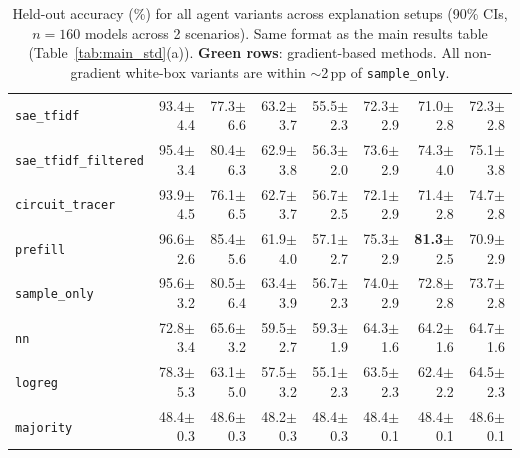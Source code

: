 \documentclass{article} %
\begin{document}
\begin{table}[t]
\begin{center}
\begin{tabular}{@{}l rrrr r | r | r@{}}
\texttt{sae\_tfidf} & 93.4{\scriptsize$\pm$4.4} & 77.3{\scriptsize$\pm$6.6} & 63.2{\scriptsize$\pm$3.7} & 55.5{\scriptsize$\pm$2.3} & 72.3{\scriptsize$\pm$2.9} & 71.0{\scriptsize$\pm$2.8} & 72.3{\scriptsize$\pm$2.8} \\
\texttt{sae\_tfidf\_filtered} & 95.4{\scriptsize$\pm$3.4} & 80.4{\scriptsize$\pm$6.3} & 62.9{\scriptsize$\pm$3.8} & 56.3{\scriptsize$\pm$2.0} & 73.6{\scriptsize$\pm$2.9} & 74.3{\scriptsize$\pm$4.0} & 75.1{\scriptsize$\pm$3.8} \\[3pt]
\texttt{circuit\_tracer} & 93.9{\scriptsize$\pm$4.5} & 76.1{\scriptsize$\pm$6.5} & 62.7{\scriptsize$\pm$3.7} & 56.7{\scriptsize$\pm$2.5} & 72.1{\scriptsize$\pm$2.9} & 71.4{\scriptsize$\pm$2.8} & 74.7{\scriptsize$\pm$2.8} \\[3pt]
\texttt{prefill} & 96.6{\scriptsize$\pm$2.6} & 85.4{\scriptsize$\pm$5.6} & 61.9{\scriptsize$\pm$4.0} & 57.1{\scriptsize$\pm$2.7} & 75.3{\scriptsize$\pm$2.9} & \textbf{81.3}{\scriptsize$\pm$2.5} & 70.9{\scriptsize$\pm$2.9} \\
\texttt{sample\_only} & 95.6{\scriptsize$\pm$3.2} & 80.5{\scriptsize$\pm$6.4} & 63.4{\scriptsize$\pm$3.9} & 56.7{\scriptsize$\pm$2.3} & 74.0{\scriptsize$\pm$2.9} & 72.8{\scriptsize$\pm$2.8} & 73.7{\scriptsize$\pm$2.8} \\[3pt]
\texttt{nn} & 72.8{\scriptsize$\pm$3.4} & 65.6{\scriptsize$\pm$3.2} & 59.5{\scriptsize$\pm$2.7} & 59.3{\scriptsize$\pm$1.9} & 64.3{\scriptsize$\pm$1.6} & 64.2{\scriptsize$\pm$1.6} & 64.7{\scriptsize$\pm$1.6} \\
\texttt{logreg} & 78.3{\scriptsize$\pm$5.3} & 63.1{\scriptsize$\pm$5.0} & 57.5{\scriptsize$\pm$3.2} & 55.1{\scriptsize$\pm$2.3} & 63.5{\scriptsize$\pm$2.3} & 62.4{\scriptsize$\pm$2.2} & 64.5{\scriptsize$\pm$2.3} \\
\texttt{majority} & 48.4{\scriptsize$\pm$0.3} & 48.6{\scriptsize$\pm$0.3} & 48.2{\scriptsize$\pm$0.3} & 48.4{\scriptsize$\pm$0.3} & 48.4{\scriptsize$\pm$0.1} & 48.4{\scriptsize$\pm$0.1} & 48.6{\scriptsize$\pm$0.1} \\
\bottomrule
\end{tabular}
\renewcommand{\arraystretch}{1.0}
\end{center}
\caption{Held-out accuracy (\%) for all agent variants across explanation setups (90\% CIs, $n{=}160$ models across 2 scenarios). Same format as the main results table (Table~\ref{tab:main_std}(a)). {\setlength{\fboxsep}{1pt}\colorbox{gradrow}{\textbf{Green rows}}}: gradient-based methods. All non-gradient white-box variants are within ${\sim}$2\,pp of \texttt{sample\_only}.}
\label{tab:full_variants}
\end{table}
\end{document}

